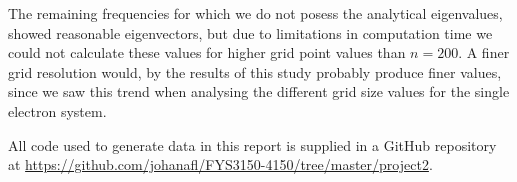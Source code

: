 \documentclass{emulateapj}
\begin{document}
    The remaining frequencies for which we do not posess the analytical eigenvalues, showed reasonable eigenvectors, but due to limitations in computation time we could not calculate these values for higher grid point values than $n = 200$. A finer grid resolution would, by the results of this study probably produce finer values, since we saw this trend when analysing the different grid size values for the single electron system.
    
    
    
    
    All code used to generate data in this report is supplied in a GitHub repository at \url{https://github.com/johanafl/FYS3150-4150/tree/master/project2}.



% 
\end{document}
